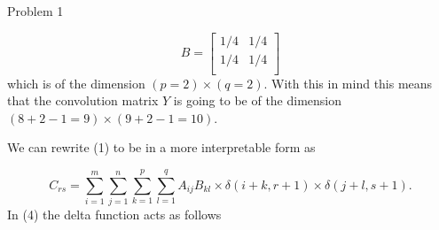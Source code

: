 \begin{problem}{Problem 1}
\begin{highlight}[Solution]
        \begin{equation}
            B = 
            \begin{bmatrix}
                1/4 & 1/4 \\
                1/4 & 1/4 \\
            \end{bmatrix}
        \end{equation}
        which is of the dimension $(p = 2) \times (q = 2)$. With this in mind this means that the convolution matrix $Y$ is going to be of the dimension $(8 + 2 - 1 = 9) \times (9 + 2 - 1 = 10)$.

        We can rewrite (1) to be in a more interpretable form as 

        \begin{equation}
            C_{rs} = \sum_{i = 1}^{m}\sum_{j = 1}^{n}\sum_{k = 1}^{p}\sum_{l = 1}^{q} A_{ij}B_{kl} \times \delta(i + k, r + 1) \times \delta(j + l, s + 1).
        \end{equation}
        In (4) the delta function acts as follows


\end{highlight}
\end{problem}

